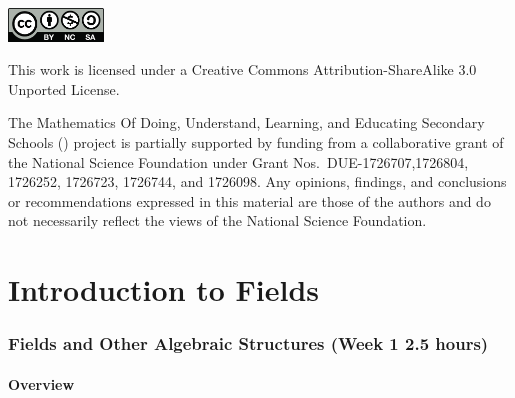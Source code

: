 \documentclass[11pt]{article}
\theoremstyle{definition}
\begin{document}
\maketitle
	
\vfill 
\begin{center} \includegraphics[width=1in]{by-nc-sa.png} \end{center}
\footnotesize{ This work is licensed under a Creative Commons Attribution-ShareAlike 3.0 Unported License. }

\footnotesize{
The Mathematics Of Doing, Understand, Learning, and Educating Secondary Schools (\MODULES) project is partially supported by funding from a collaborative grant of the National Science Foundation under Grant Nos.~DUE-1726707,1726804, 1726252, 1726723, 1726744, and 1726098.  Any opinions, findings, and conclusions or recommendations expressed in this material are those of the authors and do not necessarily reflect the views of the National Science Foundation.}
\newpage
\thispagestyle{plain}   
\listoftodos
\tableofcontents
\newpage {}
\newpage 

\part{Introduction to Fields}

\section{Fields and Other Algebraic Structures (Week 1 2.5 hours)}

\subsection{Overview}
 
\end{document}
